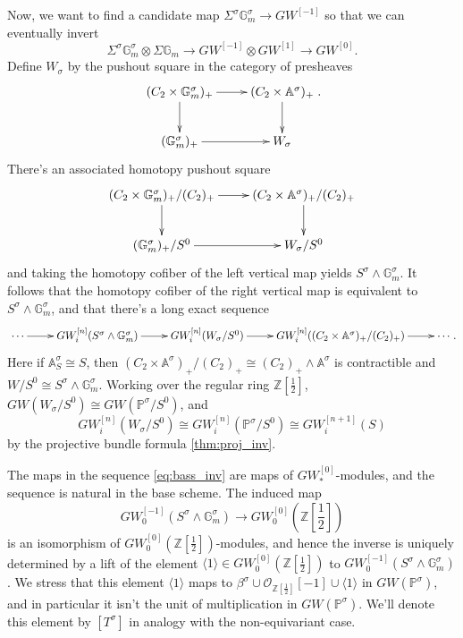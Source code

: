 \documentclass[edeposit,fullpage]{uiucthesis2009}
\newcommand{\Z}{\mathbb Z}
\newcommand{\mbb}{\mathbb}
\newcommand{\mc}{\mathcal}
\theoremstyle{plain}
\numberwithin{lemma}{section}
\theoremstyle{definition}
\begin{document}
Now, we want to find a candidate map $\Sigma^\sigma \mbb G_m^\sigma
\rightarrow GW^{[-1]}$ so that we can eventually invert 
\[
\Sigma^\sigma
\mbb G_m^\sigma \otimes \Sigma \mbb G_m \rightarrow GW^{[-1]} \otimes
GW^{[1]} \rightarrow GW^{[0]}.
\]
Define $W_\sigma$ by the pushout square in
the category of presheaves
\[
\xymatrix{(C_2 \times \mbb G_m^\sigma)_+ \ar[r]\ar[d] & (C_2 \times \mbb
  A^\sigma)_+ \ar[d] \\ (\mbb G_m^\sigma)_+ \ar[r] & W_\sigma}.
\]
There's an associated homotopy pushout square
\[
\xymatrix{(C_2 \times \mbb G_m^\sigma)_+/(C_2)_+ \ar[r]\ar[d] & (C_2 \times \mbb
  A^\sigma)_+/(C_2)_+ \ar[d] \\ (\mbb G_m^\sigma)_+/S^0 \ar[r] & W_\sigma/S^0}
\]
and taking the homotopy cofiber of the left vertical map yields
$S^\sigma \wedge \mbb G_m^\sigma$. It follows that the homotopy cofiber
of the right vertical map is equivalent to  $S^\sigma \wedge \mbb
G_m^\sigma$, and that there's a long exact sequence
\begin{equation}\label{eq:bass_inv}
\xymatrix{\cdots \ar[r] & GW_i^{[n]}(S^\sigma \wedge \mbb G_m^\sigma) \ar[r] &
  GW_i^{[n]}(W_\sigma/S^0) \ar[r] & GW_i^{[n]}((C_2 \times \mbb
  A^\sigma)_+/(C_2)_+) \ar[r] & \cdots }.
\end{equation}
Here if $\mbb A^\sigma_S \cong S$, then $(C_2 \times \mbb
  A^\sigma)_+/(C_2)_+ \cong (C_2)_+ \wedge \mbb A^\sigma$ is
  contractible and $W/S^0 \cong S^\sigma \wedge \mbb G_m^\sigma$. Working over the regular ring $\Z[\frac{1}{2}]$, $GW(W_\sigma/S^0)
\cong GW(\mbb P^\sigma/S^0)$, and
\[  
GW^{[n]}_i(W_\sigma/S^0) \cong GW^{[n]}_i(\mbb P^\sigma/S^0) \cong GW^{[n+1]}_i(S)
\]
by the projective bundle formula \ref{thm:proj_inv}. 

The maps in the sequence
  \eqref{eq:bass_inv} are maps of $GW^{[0]}_*$-modules, and the
  sequence is natural in the base scheme. The induced map
\[
GW^{[-1]}_0(S^\sigma \wedge \mbb G_m^\sigma) \rightarrow GW^{[0]}_0(\Z[\frac{1}{2}])
\]
is an isomorphism of $GW^{[0]}_0(\Z[\frac{1}{2}])$-modules, and hence
the inverse is uniquely determined by a lift of the element $\langle 1 \rangle
\in GW^{[0]}_0(\Z[\frac{1}{2}])$ to $GW^{[-1]}_0(S^\sigma \wedge \mbb
G_m^\sigma)$. We stress that this element $\langle 1 \rangle$ maps to
$\beta^\sigma \cup \mc O_{\Z[\frac{1}{2}]}[-1] \cup \langle 1 \rangle$ in $GW(\mbb P^\sigma)$,
and in particular it isn't the unit of multiplication in $GW(\mbb P^\sigma)$. We'll denote this element by $[T^\sigma]$ in analogy with
the non-equivariant case. 
\end{document}

